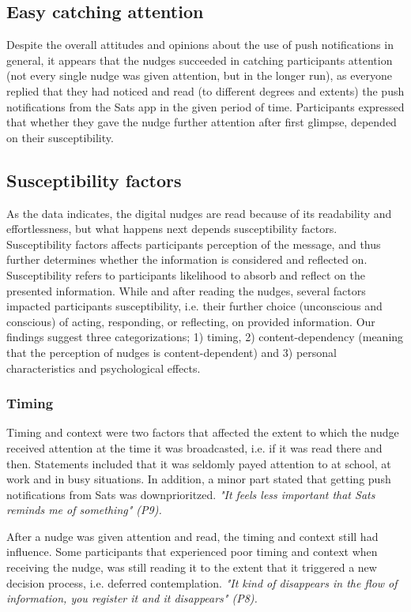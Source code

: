 \subsection{Easy catching attention}
Despite the overall attitudes and opinions about the use of push notifications in general, it appears that the nudges succeeded in catching participants attention (not every single nudge was given attention, but in the longer run), as everyone replied that they had noticed and read (to different degrees and extents) the push notifications from the Sats app in the given period of time. Participants expressed that whether they gave the nudge further attention after first glimpse, depended on their susceptibility. 

\subsection{Susceptibility factors}
As the data indicates, the digital nudges are read because of its readability and effortlessness, but what happens next depends susceptibility factors. Susceptibility factors affects participants perception of the message, and thus further determines whether the information is considered and reflected on. Susceptibility refers to participants likelihood to absorb and reflect on the presented information. While and after reading the nudges, several factors impacted participants susceptibility, i.e. their further choice (unconscious and conscious) of acting, responding, or reflecting, on provided information. Our findings suggest three categorizations; 1) timing, 2) content-dependency (meaning that the perception of nudges is content-dependent) and 3) personal characteristics and psychological effects. 

\subsubsection{Timing}
 Timing and context were two factors that affected the extent to which the nudge received attention at the time it was broadcasted, i.e. if it was read there and then. Statements included that it was seldomly payed attention to at school, at work and in busy situations. In addition, a minor part stated that getting push notifications from Sats was downprioritzed.\textit{ "It feels less important that Sats reminds me of something" (P9). }

After a nudge was given attention and read, the timing and context still had influence. Some participants that experienced poor timing and context when receiving the nudge, was still reading it to the extent that it triggered a new decision process, i.e. deferred contemplation. \textit{"It kind of disappears in the flow of information, you register it and it disappears" (P8).}

